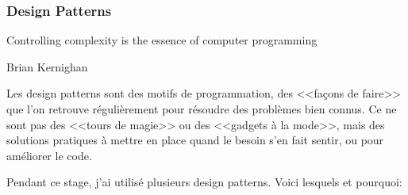 \documentclass[a4paper,french,12pt]{article}
\begin{document}
	  \subsubsection{Design Patterns}
	      \epigraph{Controlling complexity is the essence of computer programming}{Brian Kernighan}



	    Les design patterns sont des motifs de programmation, des <<façons de faire>> que l'on retrouve régulièrement
	    pour résoudre des problèmes bien connus. Ce ne sont pas des <<tours de magie>> ou des  <<gadgets à la mode>>,
	    mais des solutions pratiques à mettre en place quand le besoin s'en fait sentir, ou pour améliorer le code.

	    Pendant ce stage, j'ai utilisé plusieurs design patterns. Voici lesquels et pourquoi:
\end{document}
